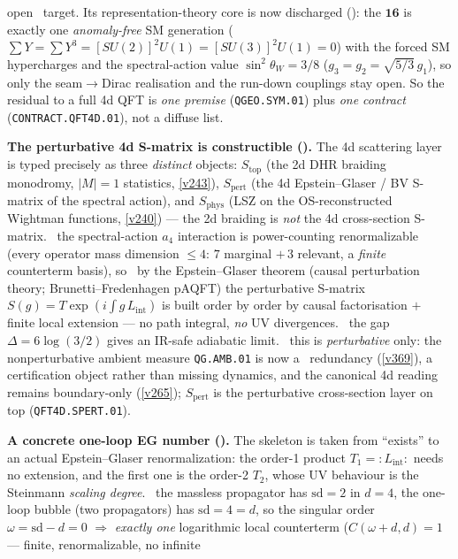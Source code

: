 \documentclass[11pt,a4paper]{article}
\begin{document}
\begin{keybox}
open \mO\ target. Its representation-theory core is now discharged
(): the $\mathbf{16}$ is exactly one
\emph{anomaly-free} SM generation ($\sum Y=\sum Y^3=[SU(2)]^2U(1)=[SU(3)]^2U(1)=0$)
with the forced SM hypercharges and the spectral-action value $\sin^2\theta_W=3/8$
($g_3=g_2=\sqrt{5/3}\,g_1$), so only the seam$\to$Dirac realisation and the
run-down couplings stay open. So the residual to a full 4d QFT is \emph{one premise}
(\texttt{QGEO.SYM.01}) plus \emph{one contract} (\texttt{CONTRACT.QFT4D.01}), not a
diffuse list.
\par\smallskip\noindent\textbf{The perturbative 4d S-matrix is constructible ().}
The 4d scattering layer is typed precisely as three \emph{distinct} objects: $S_{\mathrm{top}}$ (the 2d DHR
braiding monodromy, $|M|{=}1$ statistics, \vref{v243}), $S_{\mathrm{pert}}$ (the 4d Epstein--Glaser / BV
S-matrix of the spectral action), and $S_{\mathrm{phys}}$ (LSZ on the OS-reconstructed Wightman functions,
\vref{v240}) --- the 2d braiding is \emph{not} the 4d cross-section S-matrix. \mE\ the spectral-action $a_4$
interaction is power-counting renormalizable (every operator mass dimension $\le4$: $7$ marginal $+\,3$
relevant, a \emph{finite} counterterm basis), so \mC\ by the Epstein--Glaser theorem (causal perturbation
theory; Brunetti--Fredenhagen pAQFT) the perturbative S-matrix $S(g)=T\exp(i\!\int g\,L_{\mathrm{int}})$ is
built order by order by causal factorisation $+$ finite local extension --- no path integral, \emph{no} UV
divergences. \mC\ the gap $\Delta=6\log(3/2)$ gives an IR-safe adiabatic limit. \mC\ this is \emph{perturbative}
only: the nonperturbative ambient measure \texttt{QG.AMB.01} is now a \mC\ redundancy (\vref{v369}), a
certification object rather than missing dynamics, and the canonical 4d reading remains
boundary-only (\vref{v265}); $S_{\mathrm{pert}}$ is the perturbative cross-section layer on top
(\texttt{QFT4D.SPERT.01}).
\par\smallskip\noindent\textbf{A concrete one-loop EG number ().}
The skeleton is taken from ``exists'' to an actual Epstein--Glaser renormalization: the order-1 product
$T_1={:}L_{\mathrm{int}}{:}$ needs no extension, and the first one is the order-2 $T_2$, whose UV behaviour is
the Steinmann \emph{scaling degree}. \mE\ the massless propagator has $\mathrm{sd}=2$ in $d=4$, the one-loop
bubble (two propagators) has $\mathrm{sd}=4=d$, so the singular order $\omega=\mathrm{sd}-d=0$ $\Rightarrow$
\emph{exactly one} logarithmic local counterterm ($C(\omega{+}d,d)=1$ --- finite, renormalizable, no infinite

\end{keybox}
\end{document}
